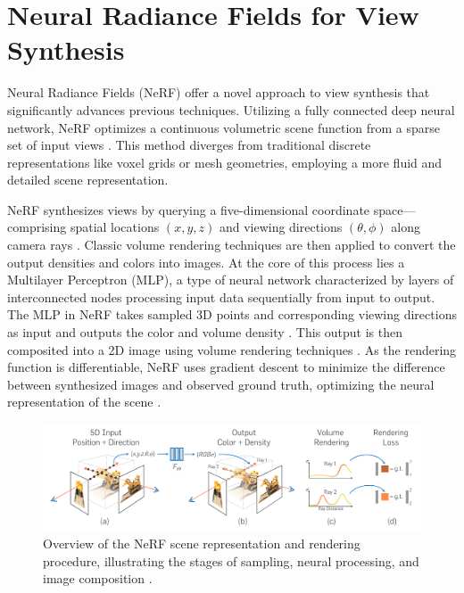 \section{Neural Radiance Fields for View Synthesis}

Neural Radiance Fields (NeRF) offer a novel approach to view synthesis that significantly advances previous techniques.
Utilizing a fully connected deep neural network, NeRF optimizes a continuous volumetric scene function from a sparse set of input views \cite{mildenhall_nerf_2021}.
This method diverges from traditional discrete representations like voxel grids or mesh geometries, employing a more fluid and detailed scene representation.

NeRF synthesizes views by querying a five-dimensional coordinate space—comprising spatial locations \((x, y, z)\) and viewing directions \((\theta, \phi)\) along camera rays .
Classic volume rendering techniques are then applied to convert the output densities and colors into images.
At the core of this process lies a Multilayer Perceptron (MLP), a type of neural network characterized by layers of interconnected nodes processing input data sequentially from input to output.
The MLP in NeRF takes sampled 3D points and corresponding viewing directions as input and outputs the color and volume density .
This output is then composited into a 2D image using volume rendering techniques .
As the rendering function is differentiable, NeRF uses gradient descent to minimize the difference between synthesized images and observed ground truth, optimizing the neural representation of the scene .

\begin{figure}[h!]
  \centering
  \includegraphics[width=\textwidth]{figures/bg-nerf.png}
  \caption{Overview of the NeRF scene representation and rendering procedure, illustrating the stages of sampling, neural processing, and image composition \cite{mildenhall_nerf_2021}.}
  \label{fig:nerf-overview}
\end{figure}

